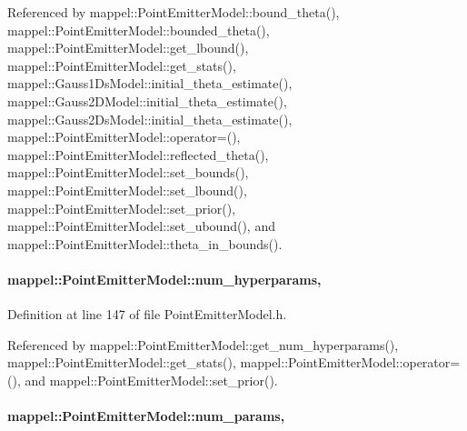 Referenced by mappel\+::\+Point\+Emitter\+Model\+::bound\+\_\+theta(), mappel\+::\+Point\+Emitter\+Model\+::bounded\+\_\+theta(), mappel\+::\+Point\+Emitter\+Model\+::get\+\_\+lbound(), mappel\+::\+Point\+Emitter\+Model\+::get\+\_\+stats(), mappel\+::\+Gauss1\+Ds\+Model\+::initial\+\_\+theta\+\_\+estimate(), mappel\+::\+Gauss2\+D\+Model\+::initial\+\_\+theta\+\_\+estimate(), mappel\+::\+Gauss2\+Ds\+Model\+::initial\+\_\+theta\+\_\+estimate(), mappel\+::\+Point\+Emitter\+Model\+::operator=(), mappel\+::\+Point\+Emitter\+Model\+::reflected\+\_\+theta(), mappel\+::\+Point\+Emitter\+Model\+::set\+\_\+bounds(), mappel\+::\+Point\+Emitter\+Model\+::set\+\_\+lbound(), mappel\+::\+Point\+Emitter\+Model\+::set\+\_\+prior(), mappel\+::\+Point\+Emitter\+Model\+::set\+\_\+ubound(), and mappel\+::\+Point\+Emitter\+Model\+::theta\+\_\+in\+\_\+bounds().

\paragraph[{\texorpdfstring{num\+\_\+hyperparams}{num_hyperparams}}]{ mappel\+::\+Point\+Emitter\+Model\+::num\+\_\+hyperparams\hspace{0.3cm}{\ttfamily [protected]}, {\ttfamily [inherited]}}\hypertarget{classmappel_1_1PointEmitterModel_ab2423214fdd81c8212118770b5b17b1f}{}\label{classmappel_1_1PointEmitterModel_ab2423214fdd81c8212118770b5b17b1f}


Definition at line 147 of file Point\+Emitter\+Model.\+h.



Referenced by mappel\+::\+Point\+Emitter\+Model\+::get\+\_\+num\+\_\+hyperparams(), mappel\+::\+Point\+Emitter\+Model\+::get\+\_\+stats(), mappel\+::\+Point\+Emitter\+Model\+::operator=(), and mappel\+::\+Point\+Emitter\+Model\+::set\+\_\+prior().

\paragraph[{\texorpdfstring{num\+\_\+params}{num_params}}]{ mappel\+::\+Point\+Emitter\+Model\+::num\+\_\+params\hspace{0.3cm}{\ttfamily [protected]}, {\ttfamily [inherited]}}\hypertarget{classmappel_1_1PointEmitterModel_a9af0484391bd6021ddc04ac666ab49ad}{}\label{classmappel_1_1PointEmitterModel_a9af0484391bd6021ddc04ac666ab49ad}


